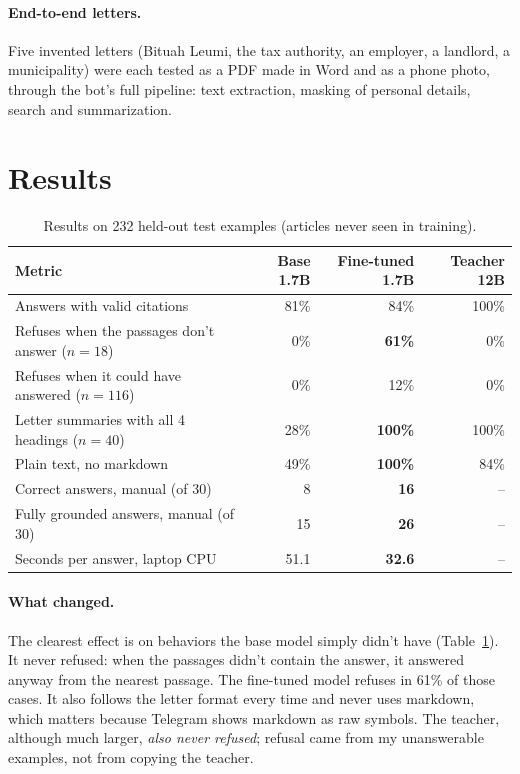 \documentclass[11pt]{article}
\begin{document}
\paragraph{End-to-end letters.} Five invented letters (Bituah Leumi, the tax authority, an employer, a landlord, a municipality) were each tested as a PDF made in Word and as a phone photo, through the bot's full pipeline: text extraction, masking of personal details, search and summarization.

\section{Results}

\begin{table}[ht]
\centering
\small
\begin{tabular}{@{}lrrr@{}}
\toprule
\textbf{Metric} & \textbf{Base 1.7B} & \textbf{Fine-tuned 1.7B} & \textbf{Teacher 12B} \\
\midrule
Answers with valid citations & 81\% & 84\% & 100\% \\
Refuses when the passages don't answer ($n=18$) & 0\% & \textbf{61\%} & 0\% \\
Refuses when it could have answered ($n=116$) & 0\% & 12\% & 0\% \\
Letter summaries with all 4 headings ($n=40$) & 28\% & \textbf{100\%} & 100\% \\
Plain text, no markdown & 49\% & \textbf{100\%} & 84\% \\
Correct answers, manual (of 30) & 8 & \textbf{16} & -- \\
Fully grounded answers, manual (of 30) & 15 & \textbf{26} & -- \\
Seconds per answer, laptop CPU & 51.1 & \textbf{32.6} & -- \\
\bottomrule
\end{tabular}
\caption{Results on 232 held-out test examples (articles never seen in training).}
\label{tab:results}
\end{table}

\paragraph{What changed.} The clearest effect is on behaviors the base model simply didn't have (Table~\ref{tab:results}). It never refused: when the passages didn't contain the answer, it answered anyway from the nearest passage. The fine-tuned model refuses in 61\% of those cases. It also follows the letter format every time and never uses markdown, which matters because Telegram shows markdown as raw symbols. The teacher, although much larger, \emph{also never refused}; refusal came from my unanswerable examples, not from copying the teacher.
\end{document}
